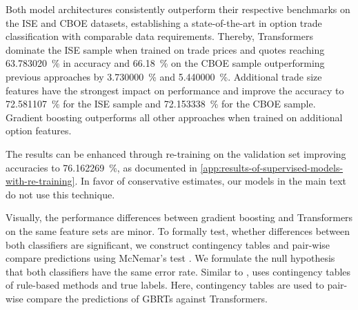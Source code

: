Both model architectures consistently outperform their respective benchmarks on the \gls{ISE} and \gls{CBOE} datasets, establishing a state-of-the-art in option trade classification with comparable data requirements. Thereby, Transformers dominate the \gls{ISE} sample when trained on trade prices and quotes reaching \SI{63.783020}{\percent}  in accuracy and \SI{66.18}{\percent} on the \gls{CBOE} sample outperforming previous approaches by \SI{3.730000}{\percent} and \SI{5.440000}{\percent}. Additional trade size features have the strongest impact on performance and improve the accuracy to \SI{72.581107}{\percent} for the \gls{ISE} sample and \SI{72.153338}{\percent} for the \gls{CBOE} sample. Gradient boosting outperforms all other approaches when trained on additional option features.

The results can be enhanced through re-training on the validation set improving accuracies to \SI{76.162269}{\percent}, as documented in \cref{app:results-of-supervised-models-with-re-training}. In favor of conservative estimates, our models in the main text do not use this technique.

Visually, the performance differences between gradient boosting and Transformers on the same feature sets are minor. To formally test, whether differences between both classifiers are significant, we construct contingency tables and pair-wise compare predictions using McNemar's test \autocite[][153--157]{mcnemarNoteSamplingError1947}. We formulate the null hypothesis that both classifiers have the same error rate.
Similar to \textcite[][267]{odders-whiteOccurrenceConsequencesInaccurate2000}, uses contingency tables of rule-based methods and true labels. Here, contingency tables are used to pair-wise compare the predictions of \glspl{GBRT} against Transformers.

